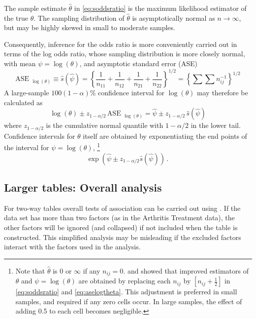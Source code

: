 \documentclass[11pt]{book}\usepackage[]{graphicx}\usepackage[]{color}
\begin{document}
The sample estimate $\hat{\theta}$ in \eqref{eq:soddsratio} is the
maximum likelihood estimator of the true $\theta$.
The sampling distribution of $\hat{\theta}$ is asymptotically normal
as $n \rightarrow \infty$, but may be highly skewed in small to
moderate samples.  

Consequently, inference for the odds ratio
is more conveniently carried out in terms of the log odds ratio,
whose sampling distribution is more closely normal, with mean
$\psi = \log (\theta)$, and asymptotic standard error (ASE)
\begin{equation}\label{eq:aselogtheta}
 \mbox{ASE }_{\log (\theta)} \equiv \hat{s} (\hat{\psi} ) =
 {\left\{
 \frac{1}{n_{11}} + \frac{1}{n_{12}} + \frac{1}{n_{21}} + \frac{1}{n_{22}}
 \right \} }^{1/2}
 =   {\left\{ \sum \sum n_{ij}^{-1} \right \} }^{1/2}
\end{equation}
A large-sample $100(1-\alpha)$\% confidence interval for $\log (\theta)$ may therefore
be calculated as 
\begin{equation*}
\log (\theta) \pm z_{1-\alpha/2} \, \mbox{ASE }_{\log (\theta)}
= \hat{\psi} \pm z_{1-\alpha/2}  \, \hat{s} (\hat{\psi} )
\end{equation*}
where $z_{ 1 - \alpha  / 2 }$ is the cumulative normal quantile with
$1-\alpha/2$ in the lower tail.
Confidence intervals for $\theta$ itself are obtained by exponentiating
the end points of the interval for $\psi = \log (\theta)$,%
\footnote{
Note that $\hat{\theta}$ is 0 or $\infty$ if any $n_{ij}=0$.
\citet{Haldane:55} and \citet{GartZweiful:67} showed that improved
estimators of $\theta$ and $\psi = \log (\theta)$ are obtained by
replacing each $n_{ij}$ by $[n_{ij} + \frac{1}{2}]$ in \eqref{eq:soddsratio}
and \eqref{eq:aselogtheta}.
This adjustment is preferred in small samples, and required if any
zero cells occur.  In large samples, the effect of adding 0.5 to each
cell becomes negligible.
}
\begin{equation*}
\exp \left(\hat{\psi}  \pm z_{ 1 - \alpha  / 2 } \hat{s} (\hat{\psi} ) \right)
\period
\end{equation*}



\subsection{Larger tables: Overall analysis}\label{sec:twoway-overall}

For two-way tables overall tests of association can be carried out
using .
If the data set has more than two factors (as in the
Arthritis Treatment data), the other factors will be
ignored (and collapsed) if not included when the table is constructed.
This simplified analysis may be misleading if
the excluded factors interact with the factors used in the
analysis.
\end{document}
